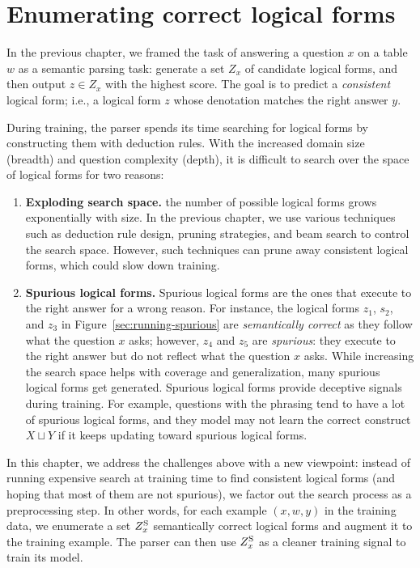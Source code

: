 \chapter{Enumerating correct logical forms}\label{chp:dpd}

In the previous chapter,
we framed the task of answering a question $x$ on a table $w$
as a semantic parsing task:
generate a set $Z_x$ of candidate logical forms,
and then output $z \in Z_x$ with the highest score.
The goal is to predict a \emph{consistent} logical form;
i.e., a logical form $z$ whose denotation
matches the right answer $y$.

During training,
the parser spends its time searching for logical forms
by constructing them with deduction rules.
With the increased domain size (breadth)
and question complexity (depth),
it is difficult to search over the space of logical forms
for two reasons:
\begin{enumerate}
\item
\textbf{Exploding search space.}
the number of possible logical forms grows exponentially with size.
In the previous chapter,
we use various techniques such as
deduction rule design,
pruning strategies,
and beam search to control the search space.
However, such techniques can prune away consistent
logical forms, which could slow down training.

\item
\textbf{Spurious logical forms.}
Spurious logical forms are the ones that execute
to the right answer for a wrong reason.
For instance, the logical forms $z_1$, $s_2$, and $z_3$
in Figure~\ref{sec:running-spurious}
are \emph{semantically correct} as they follow what
the question $x$ asks;
however, $z_4$ and $z_5$ are \emph{spurious}:
they execute to the right answer 
but do not reflect what the question $x$ asks.
While increasing the search space
helps with coverage and generalization,
many spurious logical forms get generated.
Spurious logical forms provide deceptive signals during training.
For example, questions with the phrasing 
tend to have a lot of spurious logical forms,
and they model may not learn the correct construct $X \sqcup Y$
if it keeps updating toward spurious logical forms.
\end{enumerate}

In this chapter,
we address the challenges above
with a new viewpoint:
instead of running expensive search at training time
to find consistent logical forms
(and hoping that most of them are not spurious),
we factor out the search process as a preprocessing step.
In other words,
for each example $(x, w, y)$ in the training data,
we enumerate a set $Z^\mathrm{S}_x$ semantically correct logical forms
and augment it to the training example.
The parser can then use $Z^\mathrm{S}_x$
as a cleaner training signal
to train its model.

